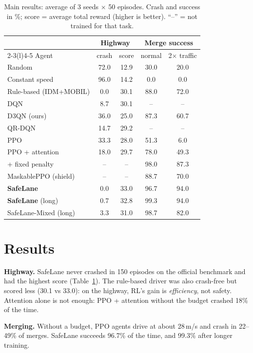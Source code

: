 \documentclass[10pt,twocolumn,a4paper]{article}
\newcommand{\term}[1]{\textbf{#1}}
\begin{document}
\begin{table}[t]\centering\small
\caption{Main results: average of 3 seeds $\times$ 50 episodes. Crash and success in \%; score = average total reward (higher is better).
``--'' = not trained for that task.}
\label{tab:main}
\setlength{\tabcolsep}{3.5pt}
\begin{tabular}{@{}lcccc@{}}\toprule
 & \multicolumn{2}{c}{Highway} & \multicolumn{2}{c}{Merge success}\\
\cmidrule(lr){2-3}\cmidrule(l){4-5}
Agent & crash & score & normal & 2$\times$ traffic\\\midrule
Random & 72.0 & 12.9 & 30.0 & 20.0 \\
Constant speed & 96.0 & 14.2 & 0.0 & 0.0 \\
Rule-based (IDM+MOBIL) & 0.0 & 30.1 & 88.0 & 72.0 \\\midrule
DQN & 8.7 & 30.1 & -- & -- \\
D3QN (ours) & 36.0 & 25.0 & 87.3 & 60.7 \\
QR-DQN & 14.7 & 29.2 & -- & -- \\
PPO & 33.3 & 28.0 & 51.3 & 6.0 \\
PPO + attention & 18.0 & 29.7 & 78.0 & 49.3 \\
\quad + fixed penalty & -- & -- & 98.0 & 87.3 \\
MaskablePPO (shield) & -- & -- & 88.7 & 70.0 \\\midrule
\textbf{SafeLane} & 0.0 & 33.0 & 96.7 & 94.0 \\
\textbf{SafeLane} (long) & 0.7 & 32.8 & 99.3 & 94.0 \\
SafeLane-Mixed (long) & 3.3 & 31.0 & 98.7 & 82.0 \\
\bottomrule
\end{tabular}
\end{table}


\section{Results}
\term{Highway.} SafeLane never crashed in 150 episodes on the official benchmark and had the highest score (Table~\ref{tab:main}).
The rule-based driver was also crash-free but scored less (30.1 vs 33.0): on the highway, RL's gain is \emph{efficiency}, not safety.
Attention alone is not enough: PPO + attention without the budget crashed 18\% of the time.

\term{Merging.} Without a budget, PPO agents drive at about 28\,m/s and crash in 22--49\% of merges. SafeLane succeeds 96.7\% of the
time, and 99.3\% after longer training.
\end{document}

